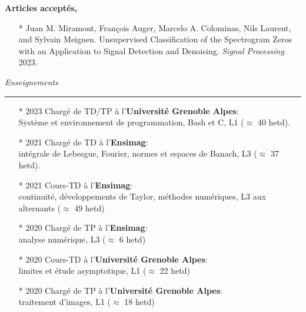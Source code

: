 \documentclass[a4paper,10pt, french]{article}
\begin{document}
\textbf{Articles acceptés,}
\begin{itemize}
	\item[*] Juan M. Miramont, François Auger, Marcelo A. Colominas, Nils Laurent, and Sylvain Meignen. Unsupervised Classification of the Spectrogram Zeros with an Application to Signal Detection and Denoising. \textit{Signal Processing} 2023.
\end{itemize}
\vspace{5mm}


\noindent
\textit{\Large \color{MyGray} \hspace{5mm} Enseignements}
\vspace{2mm}
{\color{DefaultGray}\hrule height .1pt}
\vspace{4mm}

\begin{itemize}
	\setlength\itemsep{3mm}
	\item[*] 2023 Chargé de TD/TP à l'\textbf{Université Grenoble Alpes}:\\
	Système et environnement de programmation, Bash et C, L1 ($\approx$ 40 hetd).
	\item[*] 2021 Chargé de TD à l'\textbf{Ensimag}:\\
	intégrale de Lebesgue, Fourier, normes et espaces de Banach, L3 ($\approx$ 37 hetd).
	\item[*] 2021 Cours-TD à l'\textbf{Ensimag}:\\
	continuité, développements de Taylor, méthodes numériques, L3 aux alternants ($\approx$ 49 hetd)
	\item[*] 2020 Chargé de TP à l'\textbf{Ensimag}:\\ analyse numérique, L3 ($\approx$ 6 hetd)
	\item[*] 2020 Cours-TD à l'\textbf{Université Grenoble Alpes}:\\
	limites et étude asymptotique, L1 ($\approx$ 22 hetd)
	\item[*] 2020 Chargé de TP à l'\textbf{Université Grenoble Alpes}:\\
	traitement d'images, L1 ($\approx$ 18 hetd)
\end{itemize}
\end{document}
